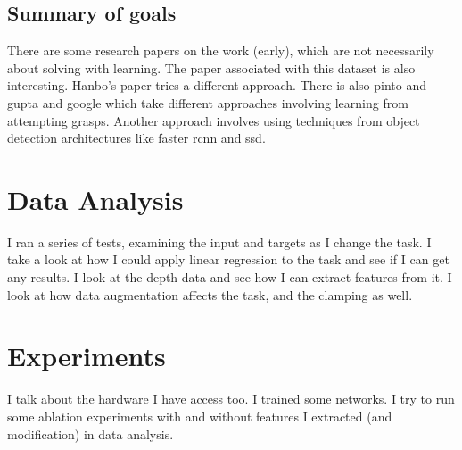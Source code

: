 \documentclass{article}
\begin{document}
\subsection{Summary of goals}
There are some research papers on the work (early), which are not necessarily
about solving with learning.
The paper associated with
this dataset is also interesting. Hanbo's paper tries a different approach.
There is also pinto and gupta and google which take different approaches
involving learning from attempting grasps. Another approach involves using
techniques from object detection architectures like faster rcnn and ssd.


\section{Data Analysis}
I ran a series of tests, examining the input and targets as I change the task.
I take a look at how I could apply linear regression to the task and see if
I can get any results. I look at the depth data and see how I can extract
features from it. I look at how data augmentation affects the task, and the
clamping as well.

\section{Experiments}
I talk about the hardware I have access too. I trained some networks. I try
to run some ablation experiments with and without features I extracted (and
modification) in data analysis.



\end{document}
